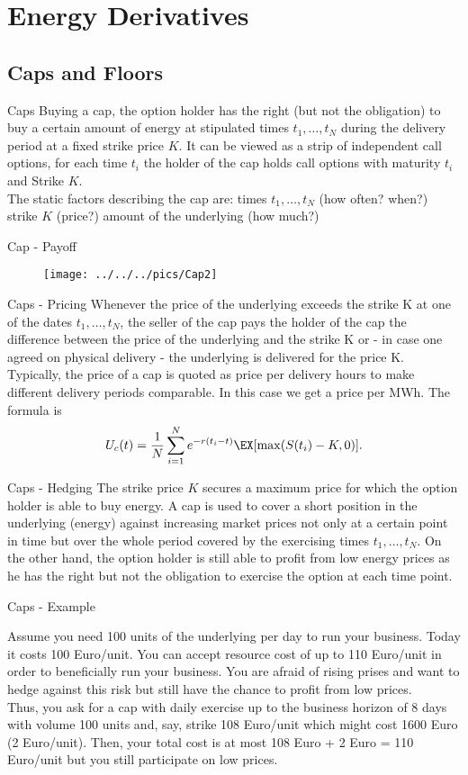 
\section{Energy Derivatives}
\subsection{Caps and  Floors}

Caps
	Buying a cap, the option holder has the right (but not the
	obligation) to buy a certain amount of energy at stipulated times
	$t_1,\ldots,t_N$ during the delivery period at a fixed strike
	price $K$. It can be viewed as a strip of
	independent call options, for each time $t_i$ the holder of the cap holds call options with maturity $t_i$ and Strike $K$. \\
	The static factors describing the cap are:
		times $t_1,\ldots,t_N$ (how often? when?)
		strike $K$ (price?)
		amount of the underlying (how much?)


Cap - Payoff
\begin{figure}
	\centering
		\texttt{[image: ../../../pics/Cap2]}
	\label{fig:Cap2}
\end{figure}


Caps - Pricing
Whenever the price of the underlying exceeds the strike K at one of the dates $t_1,\ldots,t_N$, the seller of the 
cap pays the holder of the cap the difference between the price of the underlying and the strike K or - in case 
one agreed on physical delivery - the underlying is delivered for the price K.
Typically, the price of a cap is quoted as price per delivery hours to make
different delivery periods comparable. In this case we get a price
per MWh. The formula is
$$U_c(t)=\frac{1}{N}\sum_{i=1}^Ne^{-r(t_i-t)}\EX[\max(S(t_i)-K,0)].$$


Caps - Hedging
The strike price $K$ secures a maximum price for which the option holder is able to buy energy. A cap is used to cover a short position in the underlying (energy) against
increasing market prices not only at a certain point in time but over the whole period covered by the exercising times $t_1,\ldots,t_N$.
On the other hand, the option holder is still able to profit from low energy prices as he has the right but not the obligation to exercise the option at each time point.


Caps - Example

Assume you need 100 units of the underlying per day to run your business. Today it costs 100 Euro/unit. You can accept resource cost of up to 110 Euro/unit in order to beneficially run your business. You are afraid of rising prises and want to hedge against this risk but still have the chance to profit from low prices.\\
Thus, you ask for a cap with daily exercise up to the business horizon of 8 days with volume 100 units and, say, strike 108 Euro/unit which might cost 1600 Euro (2 Euro/unit). Then, your total cost is at most 108 Euro + 2 Euro = 110 Euro/unit but you still participate on low prices.


